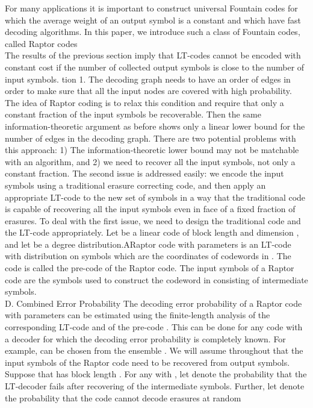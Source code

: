 For many applications it is important to construct universal
Fountain codes for which the average weight of an output
symbol is a constant and which have fast decoding algorithms.
In this paper, we introduce such a class of Fountain codes,
called Raptor codes\\
The results of the previous section imply that LT-codes
cannot be encoded with constant cost if the number of collected
output symbols is close to the number of input symbols. tion 1. The decoding graph needs to have an order of
edges in order to make sure that all the input nodes are covered
with high probability. The idea of Raptor coding is to relax
this condition and require that only a constant fraction of the
input symbols be recoverable. Then the same information-theoretic
argument as before shows only a linear lower bound for
the number of edges in the decoding graph.
There are two potential problems with this approach: 1) The
information-theoretic lower bound may not be matchable with
an algorithm, and 2) we need to recover all the input symbols,
not only a constant fraction.
The second issue is addressed easily: we encode the input
symbols using a traditional erasure correcting code, and then
apply an appropriate LT-code to the new set of symbols in a
way that the traditional code is capable of recovering all the
input symbols even in face of a fixed fraction of erasures. To
deal with the first issue, we need to design the traditional code
and the LT-code appropriately.
Let be a linear code of block length and dimension , and
let be a degree distribution.ARaptor code with parameters
is an LT-code with distribution on symbols
which are the coordinates of codewords in . The code is
called the pre-code of the Raptor code. The input symbols of a
Raptor code are the symbols used to construct the codeword in
consisting of intermediate symbols.\\
D. Combined Error Probability
The decoding error probability of a Raptor code with parameters
can be estimated using the finite-length analysis
of the corresponding LT-code and of the pre-code . This
can be done for any code with a decoder for which the decoding
error probability is completely known. For example,
can be chosen from the ensemble .
We will assume throughout that the input symbols of the
Raptor code need to be recovered from output symbols.
Suppose that has block length . For any with , let
denote the probability that the LT-decoder fails after recovering
of the intermediate symbols. Further, let denote the
probability that the code cannot decode erasures at random
